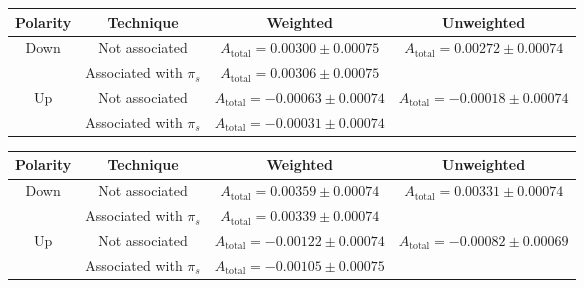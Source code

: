 \documentclass{article}
\begin{document}
        \begin{center}
                \begin{tabular}{c|c|c|c}
                        Polarity & Technique & Weighted & Unweighted\\
                        \hline\hline
                        \multirow{2}{*}{Down} & Not associated & $A_\text{total} = 0.00300 \pm 0.00075$ & \multirow{2}{*}{$A_\text{total} = 0.00272 \pm 0.00074$}\\
                        \cline{2-3}
                        & Associated with $\pi_s$ & $A_\text{total} = 0.00306 \pm 0.00075$ & \\
                        \hline
                        \multirow{2}{*}{Up} & Not associated & $A_\text{total} = - 0.00063 \pm 0.00074$ & \multirow{2}{*}{$A_\text{total} = - 0.00018 \pm 0.00074$}\\
                        \cline{2-3}
                        & Associated with $\pi_s$ & $A_\text{total} = - 0.00031 \pm 0.00074$ & \\
                \end{tabular}
                \label{tab:2015}
        \end{center}
        \begin{center}
                \begin{tabular}{c|c|c|c}
                        Polarity & Technique & Weighted & Unweighted\\
                        \hline\hline
                        \multirow{2}{*}{Down} & Not associated & $A_\text{total} = 0.00359 \pm 0.00074$ & \multirow{2}{*}{$A_\text{total} = 0.00331 \pm 0.00074$}\\
                        \cline{2-3}
                        & Associated with $\pi_s$ & $A_\text{total} = 0.00339 \pm 0.00074$ & \\
                        \hline
                        \multirow{2}{*}{Up} & Not associated & $A_\text{total} = - 0.00122 \pm 0.00074$ & \multirow{2}{*}{$A_\text{total} = - 0.00082 \pm 0.00069$}\\
                        \cline{2-3}
                        & Associated with $\pi_s$ & $A_\text{total} = - 0.00105 \pm 0.00075$ & \\
                \end{tabular}
                \label{tab:2016}
        \end{center}
\end{document}
